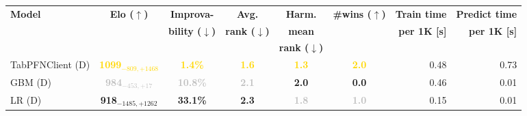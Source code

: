 \begin{tabular}{lcccccrr}
\toprule
\textbf{Model} & \textbf{Elo ($\uparrow$)} & \textbf{Improva-} & \textbf{Avg.} & \textbf{Harm.} & \textbf{\#wins ($\uparrow$)} & \textbf{Train time} & \textbf{Predict time} \\
 &  & \textbf{bility ($\downarrow$)} & \textbf{rank ($\downarrow$)} & \textbf{mean} &  & \textbf{per 1K [s]} & \textbf{per 1K [s]} \\
 &  &  &  & \textbf{rank ($\downarrow$)} &  &  &  \\
\midrule
[Lapse] TabPFNClient (D) & \textcolor{gold}{\textbf{1099${}_{-809,+1468}$}} & \textcolor{gold}{\textbf{1.4\%}} & \textcolor{gold}{\textbf{1.6}} & \textcolor{gold}{\textbf{1.3}} & \textcolor{gold}{\textbf{2.0}} & 0.48 & 0.73 \\
[Lapse] GBM (D) & \textcolor{silver}{\textbf{984${}_{-453,+17}$}} & \textcolor{silver}{\textbf{10.8\%}} & \textcolor{silver}{\textbf{2.1}} & \textcolor{bronze}{\textbf{2.0}} & \textcolor{bronze}{\textbf{0.0}} & 0.46 & 0.01 \\
[Lapse] LR (D) & \textcolor{bronze}{\textbf{918${}_{-1485,+1262}$}} & \textcolor{bronze}{\textbf{33.1\%}} & \textcolor{bronze}{\textbf{2.3}} & \textcolor{silver}{\textbf{1.8}} & \textcolor{silver}{\textbf{1.0}} & 0.15 & 0.01 \\
\bottomrule
\end{tabular}